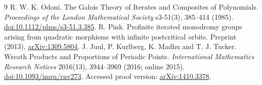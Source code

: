\documentclass[10pt]{article}
\begin{document}
\begin{thebibliography}{9}
R. W. K. Odoni.
The Galois Theory of Iterates and Composites of Polynomials.
\emph{Proceedings of the London Mathematical Society}
s3-51(3), 385--414 (1985).
\href{https://doi.org/10.1112/plms/s3-51.3.385}{doi:10.1112/plms/s3-51.3.385}.
R. Pink.
Profinite iterated monodromy groups arising from quadratic morphisms
with infinite postcritical orbits.
Preprint (2013), \href{https://arxiv.org/abs/1309.5804}{arXiv:1309.5804}.
J. Juul, P. Kurlberg, K. Madhu and T. J. Tucker.
Wreath Products and Proportions of Periodic Points.
\emph{International Mathematics Research Notices}
2016(13), 3944--3969 (2016; online 2015).
\href{https://doi.org/10.1093/imrn/rnv273}{doi:10.1093/imrn/rnv273}.
Accessed proof version: \href{https://arxiv.org/abs/1410.3378}{arXiv:1410.3378}.
\end{thebibliography}
\end{document}
